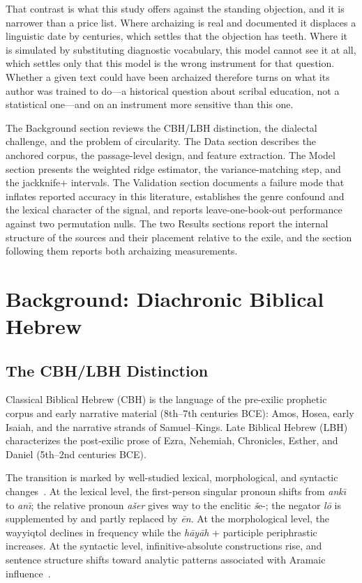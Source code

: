 \documentclass[10pt,letterpaper]{article}
\newcommand{\cbh}{CBH}
\newcommand{\lbh}{LBH}
\begin{document}
That contrast is what this study offers against the standing objection, and it
is narrower than a price list.  Where archaizing is real and documented it
displaces a linguistic date by centuries, which settles that the objection has
teeth.  Where it is simulated by substituting diagnostic vocabulary, this model
cannot see it at all, which settles only that this model is the wrong instrument
for that question.  Whether a given text could have been archaized therefore
turns on what its author was trained to do---a historical question about scribal
education, not a statistical one---and on an instrument more sensitive than this
one.

The Background section reviews the CBH/LBH distinction, the dialectal
challenge, and the problem of circularity.  The Data section describes the
anchored corpus, the passage-level design, and feature extraction.  The Model
section presents the weighted ridge estimator, the variance-matching step, and
the jackknife+ intervals.  The Validation section documents a failure mode that
inflates reported accuracy in this literature, establishes the genre confound
and the lexical character of the signal, and reports leave-one-book-out
performance against two permutation nulls.  The two Results sections report the
internal structure of the sources and their placement relative to the exile,
and the section following them reports both archaizing measurements.

\section*{Background: Diachronic Biblical Hebrew}

\subsection*{The CBH/LBH Distinction}

Classical Biblical Hebrew (\cbh{}) is the language of the pre-exilic prophetic
corpus and early narrative material (8th--7th centuries BCE): Amos, Hosea,
early Isaiah, and the narrative strands of Samuel--Kings.  Late Biblical
Hebrew (\lbh{}) characterizes the post-exilic prose of Ezra, Nehemiah,
Chronicles, Esther, and Daniel (5th--2nd centuries BCE).

The transition is marked by well-studied lexical, morphological, and syntactic
changes~\cite{Hurvitz1997,Rooker1990,Polzin1976,Young2003}.  At the lexical
level, the first-person singular pronoun shifts from \textit{ank\={\i}} to
\textit{an\={\i}}; the relative pronoun \textit{ašer} gives way to the enclitic
\textit{š}e-; the negator \textit{l\={o}\textquotesingle} is supplemented by
and partly replaced by \textit{\textquotesingle \={e}n}.  At the morphological
level, the wayyiqtol declines in frequency while the \textit{h\={a}y\={a}h} +
participle periphrastic increases.  At the syntactic level,
infinitive-absolute constructions rise, and sentence structure shifts toward
analytic patterns associated with Aramaic
influence~\cite{Young2008,Rezetko2014}.
\end{document}
